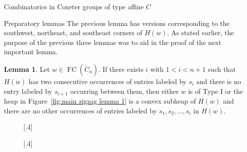 \documentclass[11pt]{amsart}
\theoremstyle{definition}
\newtheorem{lemma}[theorem]{Lemma}
\numberwithin{equation}{section}
\newcommand{\C}{\widetilde{C}}
\renewcommand{\(}{\left(}
\renewcommand{\)}{\right)}
\DeclareMathOperator{\FC}{FC}
\newcommand\xxaxis{0}
\newcommand\yyaxis{90}
\newcommand\heapblock[3]{\fill[draw=black, fill=gray!30, rounded corners, line width=1.1pt, shift={(\xxaxis:#1)},shift={(\yyaxis:#2)}] (-1,-0.5) rectangle (1,0.5);\node at (#1,#2) {\scriptsize $#3$};}
\newcommand\heapblank[2]{\fill[fill=white, dotted, draw=black, line width=1.1pt, rounded corners, shift={(\xxaxis:#1)},shift={(\yyaxis:#2)}] (-1,-0.5) rectangle (1,0.5);}
\begin{document}
\begin{section}{Combinatorics in Coxeter groups of type affine $C$}
\begin{subsection}{Preparatory lemmas}
The previous lemma has versions corresponding to the southwest, northeast, and southeast corners of $H(w)$.  As stated earlier, the purpose of the previous three lemmas was to aid in the proof of the next important lemma.  

\begin{lemma}\label{lem:main zigzag lemma}
Let $w \in \FC(\C_{n})$.  If there exists $i$ with $1<i < n+1$ such that $H(w)$ has two consecutive occurrences of entries labeled by $s_{i}$ and there is no entry labeled by $s_{i+1}$ occurring between them, then either $w$ is of Type I or the heap in Figure~\ref{fig:main zigzag lemma 1} is a convex subheap of $H(w)$ and there are no other occurrences of entries labeled by $s_{1}, s_{2}, \dots, s_{i}$ in $H(w)$.
\end{lemma}

\begin{figure}[!ht]
\subcaptionbox{\label{fig:main zigzag lemma 1}}[.4\textwidth]{
}
\subcaptionbox{\label{fig:main zigzag lemma 2}}[.4\textwidth]{
}
\end{figure}
\end{subsection}
\end{section}
\end{document}
